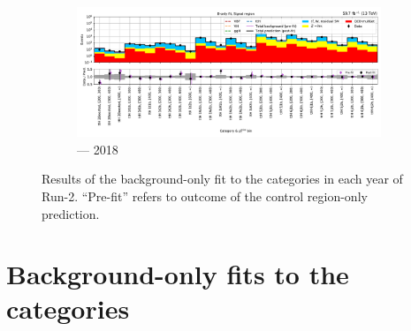 \begin{figure}[htbp]
    \begin{subfigure}[b]{0.79\textwidth}
        \includegraphics[width=\textwidth]{chapters/higgstoinv/figures/mountain_ranges/2018/ttH/SR_tree_fit_b-abs_values_ttH_cats.pdf}
        \caption{\ttH --- 2018}
    \end{subfigure}
    \caption[Results of the background-only fit to the \ttH categories in each year of Run-2]{Results of the background-only fit to the \ttH categories in each year of Run-2. ``Pre-fit'' refers to outcome of the control region-only prediction.}
    \label{fig:htoinv_mountain_range_B_only_ttH_SR}
\end{figure}

\clearpage




\section{Background-only fits to the \texorpdfstring{\VH}{VH} categories}
\label{sec:B_only_fit_plots_VH_SR}

